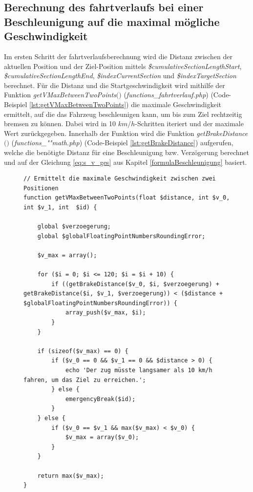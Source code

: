 \subsection{Berechnung des \Gls{fahrtverlauf}s bei einer Beschleunigung auf die maximal mögliche Geschwindigkeit} \label{v_max}
Im ersten Schritt der \Gls{fahrtverlauf}sberechnung wird die Distanz zwischen der aktuellen Position und der Ziel-Position mittels \textit{\$cumulativeSectionLengthStart}, \textit{\$cumulativeSectionLengthEnd}, \textit{\$indexCurrentSection} und \textit{\$indexTargetSection} berechnet. Für die Distanz und die Startgeschwindigkeit wird mithilfe der Funktion \textit{get\-V\-Max\-Be\-tween\-Two\-Points$($$)$} (\textit{func\-tions\_fahrt\-ver\-lauf.php}) (Code-Beispiel \ref{lst:getVMaxBetweenTwoPoints}) die maximale Geschwindigkeit ermittelt, auf die das Fahrzeug beschleunigen kann, um bis zum Ziel rechtzeitig bremsen zu können. Dabei wird in 10 $km/h$-Schritten iteriert und der maximale Wert zurückgegeben. Innerhalb der Funktion wird die Funktion \textit{getBrakeDistance$($$)$} (\textit{func\-tions\_""math.php}) (Code-Beispiel \ref{lst:getBrakeDistance}) aufgerufen, welche die benötigte Distanz für eine Beschleunigung bzw. Verzögerung berechnet und auf der Gleichung \ref{eq:s_v_ges} aus Kapitel \ref{formulaBeschleunigung} basiert.
\begin{figure}
\begin{lstlisting}[caption={\textit{getVMaxBetweenTwoPoints$($$)$} (\textit{functions\_fahrtverlauf.php})},captionpos=b,label={lst:getVMaxBetweenTwoPoints}]
// Ermittelt die maximale Geschwindigkeit zwischen zwei Positionen
function getVMaxBetweenTwoPoints(float $distance, int $v_0, int $v_1, int  $id) {

	global $verzoegerung;
	global $globalFloatingPointNumbersRoundingError;

	$v_max = array();

	for ($i = 0; $i <= 120; $i = $i + 10) {
		if ((getBrakeDistance($v_0, $i, $verzoegerung) + getBrakeDistance($i, $v_1, $verzoegerung)) < ($distance + $globalFloatingPointNumbersRoundingError)) {
			array_push($v_max, $i);
		}
	}

	if (sizeof($v_max) == 0) {
		if ($v_0 == 0 && $v_1 == 0 && $distance > 0) {
			echo 'Der zug müsste langsamer als 10 km/h fahren, um das Ziel zu erreichen.';
		} else {
			emergencyBreak($id);
		}
	} else {
		if ($v_0 == $v_1 && max($v_max) < $v_0) {
			$v_max = array($v_0);
		}
	}

	return max($v_max);
}
\end{lstlisting}
\end{figure}

